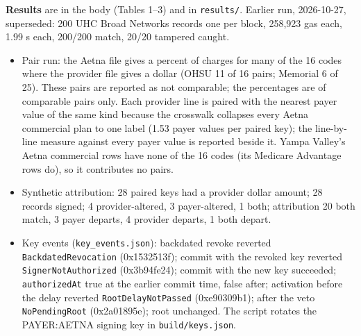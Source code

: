 \textbf{Results} are in the body (Tables 1--3) and in \texttt{results/}. Earlier run, 2026-10-27, superseded: 200 UHC Broad Networks records one per block, 258,923 gas each, 1.99 s each, 200/200 match, 20/20 tampered caught.
\begin{itemize}
\item Pair run: the Aetna file gives a percent of charges for many of the 16 codes where the provider file gives a dollar (OHSU 11 of 16 pairs; Memorial 6 of 25). These pairs are reported as not comparable; the percentages are of comparable pairs only. Each provider line is paired with the nearest payer value of the same kind because the crosswalk collapses every Aetna commercial plan to one label (1.53 payer values per paired key); the line-by-line measure against every payer value is reported beside it. Yampa Valley's Aetna commercial rows have none of the 16 codes (its Medicare Advantage rows do), so it contributes no pairs.
\item Synthetic attribution: 28 paired keys had a provider dollar amount; 28 records signed; 4 provider-altered, 3 payer-altered, 1 both; attribution 20 both match, 3 payer departs, 4 provider departs, 1 both depart.
\item Key events (\texttt{key\_events.json}): backdated revoke reverted \texttt{BackdatedRevocation} (0x1532513f); commit with the revoked key reverted \texttt{SignerNotAuthorized} (0x3b94fe24); commit with the new key succeeded; \texttt{authorizedAt} true at the earlier commit time, false after; activation before the delay reverted \texttt{RootDelayNotPassed} (0xe90309b1); after the veto \texttt{NoPendingRoot} (0x2a01895e); root unchanged. The script rotates the PAYER:AETNA signing key in \texttt{build/keys.json}.
\end{itemize}


